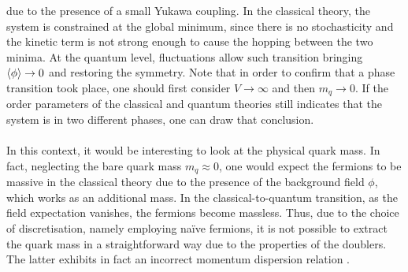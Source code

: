 due to the presence of a small Yukawa coupling. In the classical theory, the system is constrained at the global minimum, since there is no stochasticity and the kinetic term is not strong enough to cause the hopping between the two minima. At the quantum level, fluctuations allow such transition bringing $\left\langle \phi \right\rangle \to 0$ and restoring the symmetry.
Note that in order to confirm that a phase transition took place, one should first consider $V \to \infty$ and then $m_q \to 0$. If the order parameters of the classical and quantum theories still indicates that the system is 
in two different phases, one can draw that conclusion. \\~\\
In this context, it would be interesting to look at the physical quark mass. In fact, neglecting the bare quark mass $m_q \approx 0$, one would expect the fermions to be massive in the classical theory due to the presence of the background field $\phi$, which works as an additional mass. In the classical-to-quantum transition, as the field expectation vanishes, the 
fermions become massless. Thus, due to the choice of discretisation, namely employing na\"ive fermions, it is not possible to extract the quark mass in a straightforward way due to the properties of the doublers. The latter exhibits in fact an incorrect momentum dispersion relation \cite{COHEN1983102,PhysRevD.101.094512}.

\newpage

